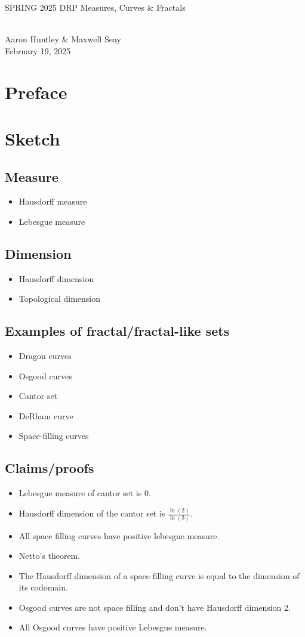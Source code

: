 \documentclass[12pt]{extarticle}
\begin{document}
	\begin{center}
		\begin{Huge}
			SPRING 2025 DRP Measures, Curves \& Fractals
		\end{Huge}
		\\[0.1in]
		Aaron Huntley \& Maxwell Seay
		\\[0.1in]
		February 19, 2025
		\\[0.4in]
	\end{center}
    \section{Preface}
    \section{Sketch}
	\subsection{Measure}
	\begin{itemize}
		\item Hausdorff measure
		\item Lebesgue measure
	\end{itemize}
	\subsection{Dimension}
	\begin{itemize}
		\item Hausdorff dimension
		\item Topological dimension
	\end{itemize}
	\subsection{Examples of fractal/fractal-like sets}
	\begin{itemize}
		\item Dragon curves
		\item Osgood curves
		\item Cantor set
		\item DeRham curve
		\item Space-filling curves
	\end{itemize}
	\subsection{Claims/proofs}
	\begin{itemize}
		\item Lebesgue measure of cantor set is 0.
		\item Hausdorff dimension of the cantor set is $\frac{\ln (2)}{\ln (3)}$.
		\item All space filling curves have positive lebesgue measure.
		\item Netto's theorem.
		\item The Hausdorff dimension of a space filling curve is equal to the dimension of its codomain.
		\item Osgood curves are not space filling and don't have Hausdorff dimension 2.
		\item All Osgood curves have positive Lebesgue measure.
	\end{itemize}
\end{document}

